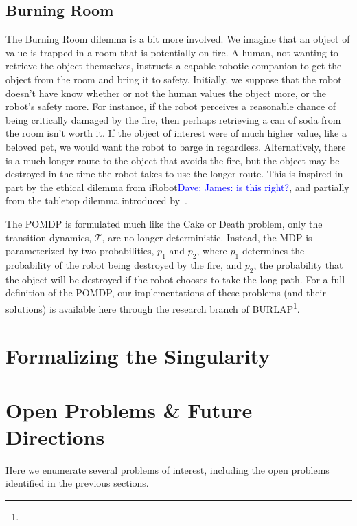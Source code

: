 \documentclass[11pt]{article}
\newcommand\davenote[1]{\textcolor{blue}{Dave: #1}}
\begin{document}
\subsection{Burning Room}

The Burning Room dilemma is a bit more involved. We imagine that an object of value is trapped in a room that is potentially on fire. A human, not wanting to retrieve the object themselves, instructs a capable robotic companion to get the object from the room and bring it to safety. Initially, we suppose that the robot doesn't have know whether or not the human values the object more, or the robot's safety more. For instance, if the robot perceives a reasonable chance of being critically damaged by the fire, then perhaps retrieving a can of soda from the room isn't worth it. If the object of interest were of much higher value, like a beloved pet, we would want the robot to barge in regardless. Alternatively, there is a much longer route to the object that avoids the fire, but the object may be destroyed in the time the robot takes to use the longer route. This is inspired in part by the ethical dilemma from iRobot\davenote{James: is this right?}, and partially from the tabletop dilemma introduced by~\cite{briggs2015sorry}.

The POMDP is formulated much like the Cake or Death problem, only the transition dynamics, $\mathcal{T}$, are no longer deterministic. Instead, the MDP is parameterized by two probabilities, $p_1$ and $p_2$, where $p_1$ determines the probability of the robot being destroyed by the fire, and $p_2$, the probability that the object will be destroyed if the robot chooses to take the long path. For a full definition of the POMDP, our implementations of these problems (and their solutions) is available here through the research branch of BURLAP\footnote{}.

\section{Formalizing the Singularity}





\section{Open Problems \& Future Directions}

Here we enumerate several problems of interest, including the open problems identified in the previous sections.
\end{document}
